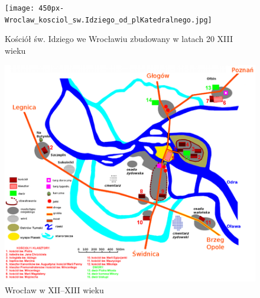 \documentclass{article}
\begin{document}
\begin{figure}[h!]
\centering
\texttt{[image: 450px-Wroclaw\_kosciol\_sw.Idziego\_od\_plKatedralnego.jpg]}
\caption{Kościół św. Idziego we Wrocławiu zbudowany w latach 20 XIII wieku}
\label{fig:kosciol}
\end{figure}

\begin{figure}[h!]
\centering
\includegraphics[scale=0.6]{450px-Wrocław.12th-13th.century.png}
\caption{Wrocław w XII–XIII wieku}
\label{fig:XII}
\end{figure}










\newpage
\end{document}

